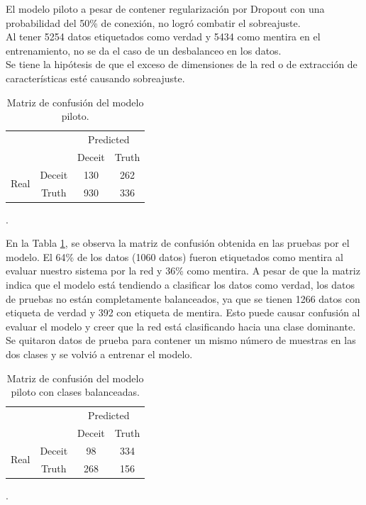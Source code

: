 \begin{onehalfspacing}
El modelo piloto a pesar de contener regularización por Dropout con una probabilidad del 50\% de conexión, no logró combatir el sobreajuste.\\

Al tener 5254 datos etiquetados como verdad y 5434 como mentira en el entrenamiento, no se da el caso de un desbalanceo en los datos.\\

Se tiene la hipótesis de que el exceso de dimensiones de la red o de extracción de características esté causando sobreajuste.\\


\begin{table}[h!]
\centering
    \begin{tabular}{|c|c|c|c|}
        \cline{3-4} \cline{4-4} 
        \multicolumn{1}{c}{} &  & \multicolumn{2}{c|}{Predicted}\tabularnewline
        \cline{3-4} \cline{4-4} 
        \multicolumn{1}{c}{} &  & Deceit & Truth \tabularnewline
        \hline 
        \multirow{2}{*}{Real} & Deceit & 130 & 262\tabularnewline
        \cline{2-4} \cline{3-4} \cline{4-4} 
         & Truth & 930 & 336\tabularnewline
        \hline 
    \end{tabular}
    \caption{\footnotesize  Matriz de confusión del modelo piloto.}.
    \label{tab:MCModeloPiloto}
\end{table}

En la Tabla \ref{tab:MCModeloPiloto}, se observa la matriz de confusión obtenida en las pruebas por el modelo.  El 64\% de los datos (1060 datos) fueron etiquetados como mentira al evaluar nuestro sistema por la red y 36\% como mentira. A pesar de que la matriz indica que el modelo está tendiendo a clasificar los datos como verdad, los datos de pruebas no están completamente balanceados, ya que se tienen 1266 datos con etiqueta de verdad y 392 con etiqueta de mentira. Esto puede causar confusión al evaluar el modelo y creer que la red está clasificando hacia una clase dominante. Se quitaron datos de prueba para contener un mismo número de muestras en las dos clases y se volvió a entrenar el modelo.\\

\begin{table}[h!]
\centering
    \begin{tabular}{|c|c|c|c|}
        \cline{3-4} \cline{4-4} 
        \multicolumn{1}{c}{} &  & \multicolumn{2}{c|}{Predicted}\tabularnewline
        \cline{3-4} \cline{4-4} 
        \multicolumn{1}{c}{} &  & Deceit & Truth \tabularnewline
        \hline 
        \multirow{2}{*}{Real} & Deceit & 98 & 334\tabularnewline
        \cline{2-4} \cline{3-4} \cline{4-4} 
         & Truth & 268 & 156\tabularnewline
        \hline 
    \end{tabular}
    \caption{\footnotesize  Matriz de confusión del modelo piloto con clases balanceadas.}.
    \label{tab:MCModeloPilotoB}
\end{table}


\end{onehalfspacing}
